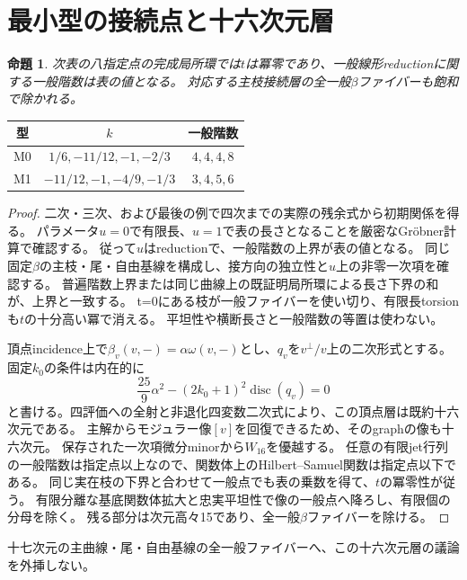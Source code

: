 \documentclass[11pt,a4paper]{ltjsarticle}
\newtheorem{proposition}[theorem]{命題}
\theoremstyle{remark}
\begin{document}
\section{最小型の接続点と十六次元層}

\begin{proposition}\label{prop:minimal-junction-v37}
次表の八指定点の完成局所環では$t$は冪零であり、一般線形reductionに関する一般階数は表の値となる。
対応する主枝接続層の全一般$\beta$ファイバーも飽和で除かれる。
\end{proposition}
\begin{center}
\begin{tabular}{ccc}\toprule
型&$k$&一般階数\\\midrule
M0&$1/6,-11/12,-1,-2/3$&$4,4,4,8$\\
M1&$-11/12,-1,-4/9,-1/3$&$3,4,5,6$\\\bottomrule
\end{tabular}
\end{center}
\begin{proof}
二次・三次、および最後の例で四次までの実際の残余式から初期関係を得る。
パラメータ$u=0$で有限長、$u=1$で表の長さとなることを厳密なGr\"obner計算で確認する。
従って$u$はreductionで、一般階数の上界が表の値となる。
同じ固定$\beta$の主枝・尾・自由基線を構成し、接方向の独立性と$u$上の非零一次項を確認する。
普遍階数上界または同じ曲線上の既証明局所環による長さ下界の和が、上界と一致する。
t=0にある枝が一般ファイバーを使い切り、有限長torsionも$t$の十分高い冪で消える。
平坦性や横断長さと一般階数の等置は使わない\cite{minimal-junction-v37}。

頂点incidence上で$\beta_v(v,-)=\alpha\omega(v,-)$とし、$q_v$を$v^\perp/v$上の二次形式とする。
固定$k_0$の条件は内在的に
\[
 \frac{25}{9}\alpha^2-(2k_0+1)^2\operatorname{disc}(q_v)=0
\]
と書ける。四評価への全射と非退化四変数二次式により、この頂点層は既約十六次元である。
主解からモジュラー像$[v]$を回復できるため、そのgraphの像も十六次元。
保存された一次項微分minorから$W_{16}$を優越する。
任意の有限jet行列の一般階数は指定点以上なので、関数体上のHilbert--Samuel関数は指定点以下である。
同じ実在枝の下界と合わせて一般点でも表の乗数を得て、$t$の冪零性が従う。
有限分離な基底関数体拡大と忠実平坦性で像の一般点へ降ろし、有限個の分母を除く。
残る部分は次元高々15であり、全一般$\beta$ファイバーを除ける\cite{minimal-junction-generic-v37}。
\end{proof}

十七次元の主曲線・尾・自由基線の全一般ファイバーへ、この十六次元層の議論を外挿しない。
\end{document}
